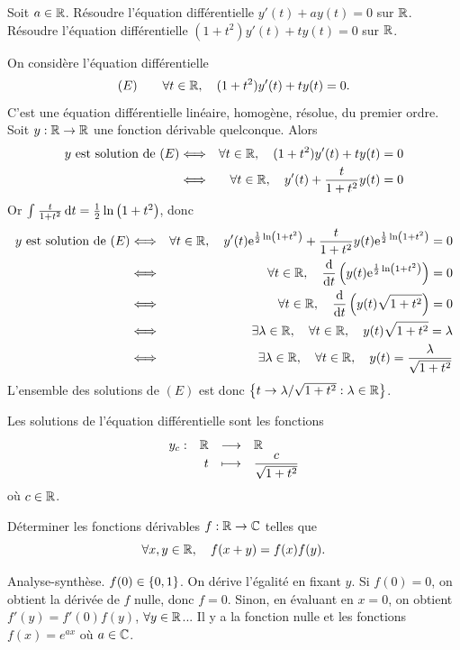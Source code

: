\documentclass{magnolia}
\begin{document}
\begin{exos}
\exo Soit $a\in\mathbb{R}$. Résoudre l'équation différentielle
  $y'(t)+a y(t)=0$ sur $\mathbb{R}$.  
\exo Résoudre l'équation différentielle $(1+t^2)y'(t)+ty(t)=0$ sur $\mathbb{R}$.
\begin{sol}
\begin{francois}
On considère l'équation différentielle
\[(E)\qquad \forall t\in\mathbb{R},\quad (1+t^2)y'(t)+ty(t)=0.\]
C'est une équation différentielle linéaire, homogène, résolue, du premier ordre. Soit $y:\mathbb{R}\to\mathbb{R}$ une fonction dérivable quelconque. Alors
\begin{eqnarray*}
\text{$y$ est solution de $(E)$}
&\Longleftrightarrow& \forall t\in\mathbb{R},\quad (1+t^2)y'(t)+ty(t)=0\\
&\Longleftrightarrow& \forall t\in\mathbb{R},\quad y'(t)+\frac{t}{1+t^2} y(t)=0
\end{eqnarray*}
Or $\int_{}^{} \frac{t}{1+t^2}\,\text{d}t=\frac{1}{2}\ln\left(1+t^2\right)$, donc
\begin{eqnarray*}
\text{$y$ est solution de $(E)$}
&\Longleftrightarrow& \forall t\in\mathbb{R},\quad y'(t){\rm e}^{\frac{1}{2}\ln\left(1+t^2\right)}+\frac{t}{1+t^2}y(t){\rm e}^{\frac{1}{2}\ln\left(1+t^2\right)}=0\\
&\Longleftrightarrow& \forall t\in\mathbb{R},\quad \frac{{\rm d}}{{\rm d}t}\left(y(t){\rm e}^{\frac{1}{2}\ln\left(1+t^2\right)}\right)=0\\
&\Longleftrightarrow& \forall t\in\mathbb{R},\quad \frac{{\rm d}}{{\rm d}t}\left(y(t)\sqrt{1+t^2}\right)=0\\
&\Longleftrightarrow& \exists\lambda\in\mathbb{R},\quad \forall t\in\mathbb{R},\quad y(t)\sqrt{1+t^2}=\lambda\\
&\Longleftrightarrow& \exists\lambda\in\mathbb{R},\quad \forall t\in\mathbb{R},\quad y(t)=\frac{\lambda}{\sqrt{1+t^2}}
\end{eqnarray*}
L'ensemble des solutions de $(E)$ est donc $\left\{t\to\lambda/\sqrt{1+t^2} : \lambda\in\mathbb{R}\right\}$.
\end{francois}
\begin{victor}
Les solutions de l'équation différentielle
sont les fonctions
\[\begin{array}[t]{lrcl} \displaystyle{y_c} : & \displaystyle{\mathbb{R}} & \longrightarrow & \displaystyle{\mathbb{R}} \\ & \displaystyle{t} & \longmapsto & \displaystyle{\frac{c}{\sqrt{1+t^2}}} \end{array}\]
où $c\in\mathbb{R}$.
\end{victor}
\end{sol}
\exo Déterminer les fonctions dérivables $f:\mathbb{R}\to\mathbb{C}$ telles que
  \[\forall x,y\in\mathbb{R},\quad f(x+y)=f(x)f(y).\]
  \begin{sol}
  Analyse-synthèse. $f(0)\in\left\{0,1\right\}$. On dérive l'égalité en fixant $y$. Si $f(0)=0$, on obtient la dérivée de $f$ nulle, donc $f=0$. Sinon, en évaluant en $x=0$, on obtient $f'(y)=f'(0)f(y)$, $\forall y \in \mathbb{R}$...
  Il y a la fonction nulle et les fonctions $f(x)=e^{ax}$ où $a\in\mathbb{C}$.
  \end{sol}
\end{exos}
\end{document}
